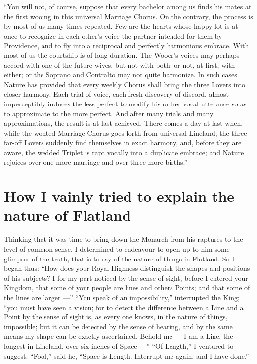 \documentclass[10pt, kindle, oneside]{kindle}
\begin{document}
``You will not, of course, suppose that every bachelor among us finds his mates
at the first wooing in this universal Marriage Chorus. On the contrary, the
process is by most of us many times repeated. Few are the hearts whose happy
lot is at once to recognize in each other's voice the partner intended for
them by Providence, and to fly into a reciprocal and perfectly harmonious
embrace. With most of us the courtship is of long duration. The Wooer's voices
may perhaps accord with one of the future wives, but not with both; or not, at
first, with either; or the Soprano and Contralto may not quite harmonize. In
such cases Nature has provided that every weekly Chorus shall bring the three
Lovers into closer harmony. Each trial of voice, each fresh discovery of
discord, almost imperceptibly induces the less perfect to modify his or her
vocal utterance so as to approximate to the more perfect. And after many
trials and many approximations, the result is at last achieved. There comes a
day at last when, while the wonted Marriage Chorus goes forth from universal
Lineland, the three far-off Lovers suddenly find themselves in exact harmony,
and, before they are aware, the wedded Triplet is rapt vocally into a
duplicate embrace; and Nature rejoices over one more marriage and over three
more births.''


\chapter{How I vainly tried to explain the nature of Flatland}


Thinking that it was time to bring down the Monarch from his raptures to the
level of common sense, I determined to endeavour to open up to him some
glimpses of the truth, that is to say of the nature of things in Flatland. So
I began thus: ``How does your Royal Highness distinguish the shapes and
positions of his subjects? I for my part noticed by the sense of sight, before
I entered your Kingdom, that some of your people are lines and others Points;
and that some of the lines are larger ---'' ``You speak of an impossibility,''
interrupted the King; ``you must have seen a vision; for to detect the
difference between a Line and a Point by the sense of sight is, as every one
knows, in the nature of things, impossible; but it can be detected by the
sense of hearing, and by the same means my shape can be exactly ascertained.
Behold me --- I am a Line, the longest in Lineland, over six inches of Space ---''
``Of Length,'' I ventured to suggest. ``Fool,'' said he, ``Space is Length.
Interrupt me again, and I have done.''
\end{document}
